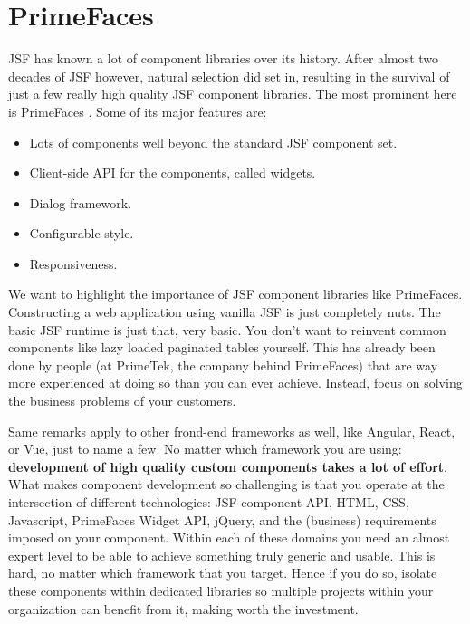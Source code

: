 %

\chapter{PrimeFaces}
\label{chap:primefaces}
JSF has known a lot of component libraries over its history.
After almost two decades of JSF however, natural selection did set in,
resulting in the survival of just a few really high quality JSF component libraries.
The most prominent here is PrimeFaces \cite{PrimeFaces}.
Some of its major features are:
\begin{itemize}
	\item Lots of components well beyond the standard JSF component set.
	\item Client-side API for the components, called widgets.
	\item Dialog framework.
	\item Configurable style.
	\item Responsiveness.
\end{itemize}
We want to highlight the importance of JSF component libraries like PrimeFaces.
Constructing a web application using vanilla JSF is just completely nuts.
The basic JSF runtime is just that, very basic.
You don't want to reinvent common components like lazy loaded paginated tables yourself.
This has already been done by people (at PrimeTek, the company behind PrimeFaces) that are way more experienced at doing so than you can ever achieve.
Instead, focus on solving the business problems of your customers.

Same remarks apply to other frond-end frameworks as well, like Angular, React, or Vue, just to name a few.
No matter which framework you are using: \textbf{development of high quality custom components takes a lot of effort}.
What makes component development so challenging is that you operate at the intersection of different technologies: JSF component API, HTML, CSS, Javascript, PrimeFaces Widget API, jQuery, and the (business) requirements imposed on your component.
Within each of these domains you need an almost expert level to be able to achieve something truly generic and usable.
This is hard, no matter which framework that you target.
Hence if you do so, isolate these components within dedicated libraries so multiple projects within your organization can benefit from it, making worth the investment.


